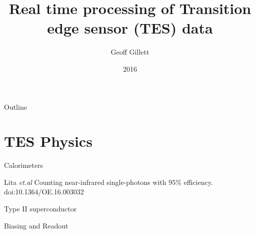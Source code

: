 \documentclass{beamer}
\title[TES Processor] %
{Real time processing of Transition edge sensor (TES) data}
\author[Geoff Gillett] %
{Geoff Gillett}
\institute[The University of Queensland] %
{
  ARC Centre of excellence for Engineered Quantum Systems\\
  ARC Centre of excellence for Quantum Computing and Communication Technology\\
  The University of Queensland}
\date[Thesis review 2016] %
{2016}
\begin{document}
\begin{frame}
  \titlepage
\end{frame}

\begin{frame}{Outline}
  \tableofcontents
\end{frame}






\section{TES Physics}
\begin{frame}{Calorimeters}
  \begin{figure}[!hpbt]
    \centering
    
  \end{figure}
  \vspace{-1 cm}
  {\Tiny Lita \emph{et.al} Counting near-infrared
  single-photons with 95\% efficiency. doi:10.1364/OE.16.003032}
\end{frame}

\begin{frame}{Type II superconductor}
  \begin{figure}[!hpbt]
    \centering
    
  \end{figure}
\end{frame}

\begin{frame}{Biasing and Readout}
  \begin{figure}[!hpbt]
  \end{figure}
\end{frame}
\end{document}

